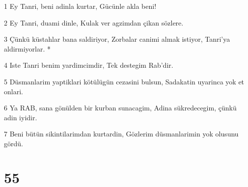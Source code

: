 \par 1 Ey Tanri, beni adinla kurtar, Gücünle akla beni!
\par 2 Ey Tanri, duami dinle, Kulak ver agzimdan çikan sözlere.
\par 3 Çünkü küstahlar bana saldiriyor, Zorbalar canimi almak istiyor, Tanri'ya aldirmiyorlar. *
\par 4 Iste Tanri benim yardimcimdir, Tek destegim Rab'dir.
\par 5 Düsmanlarim yaptiklari kötülügün cezasini bulsun, Sadakatin uyarinca yok et onlari.
\par 6 Ya RAB, sana gönülden bir kurban sunacagim, Adina sükredecegim, çünkü adin iyidir.
\par 7 Beni bütün sikintilarimdan kurtardin, Gözlerim düsmanlarimin yok olusunu gördü.

\chapter{55}

